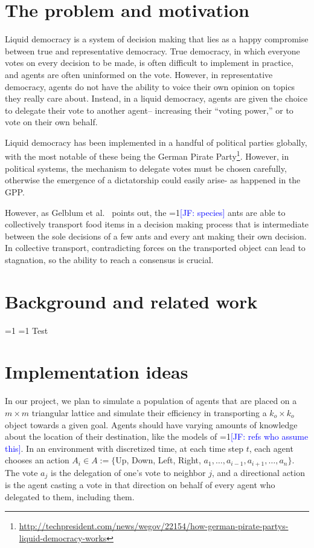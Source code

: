 \documentclass[12pt]{article}
\newcommand{\Comments}{1}
\newcommand{\mynote}[2]{\ifnum\Comments=1\textcolor{#1}{#2}\fi}
\newcommand{\mytodo}[2]{\ifnum\Comments=1%
	\todo[linecolor=#1!80!black,backgroundcolor=#1,bordercolor=#1!80!black]{#2}\fi}
\newcommand{\jessie}[1]{\mynote{blue}{[JF: #1]}}
\newcommand{\jessiet}[1]{\mytodo{blue!20!white}{JF: #1}}
\newcommand{\gabet}[1]{\mytodo{purple!20!white}{GA: #1}}
\begin{document}

\section{The problem and motivation}
Liquid democracy is a system of decision making that lies as a happy compromise between true and representative democracy.
True democracy, in which everyone votes on every decision to be made, is often difficult to implement in practice, and agents are often uninformed on the vote.
However, in representative democracy, agents do not have the ability to voice their own opinion on topics they really care about.
Instead, in a liquid democracy, agents are given the choice to delegate their vote to another agent-- increasing their ``voting power,'' or to vote on their own behalf.


Liquid democracy has been implemented in a handful of political parties globally, with the most notable of these being the German Pirate Party\footnote{\url{http://techpresident.com/news/wegov/22154/how-german-pirate-partys-liquid-democracy-works}}.
However, in political systems, the mechanism to delegate votes must be chosen carefully, otherwise the emergence of a dictatorship could easily arise- as happened in the GPP.

However, as Gelblum et al.~\cite{gelblum2015ant} points out, the \jessie{species} ants are able to collectively transport food items in a decision making process that is intermediate between the sole decisions of a few ants and every ant making their own decision.
In collective transport, contradicting forces on the transported object can lead to stagnation, so the ability to reach a consensus is crucial.

\section{Background and related work}
\jessiet{Add in lit review}
\gabet{Add in lit review}
Test

\section{Implementation ideas}
In our project, we plan to simulate a population of agents that are placed on a $m \times m$ triangular lattice and simulate their efficiency in transporting a $k_o \times k_o$ object towards a given goal.
Agents should have varying amounts of knowledge about the location of their destination, like the models of \jessie{refs who assume this}.
In an environment with discretized time, at each time step $t$, each agent chooses an action $A_i \in A := \{$Up, Down, Left, Right, $a_1, \ldots, a_{i-1}, a_{i+1}, \ldots, a_n \}$.
The vote $a_j$ is the delegation of one's vote to neighbor $j$, and a directional action is the agent casting a vote in that direction on behalf of every agent who delegated to them, including them.
\end{document}
